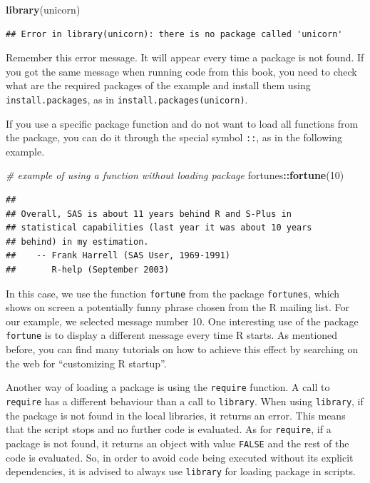 \documentclass[11pt,]{book}
\newenvironment{Shaded}{\begin{snugshade}}{\end{snugshade}}
\newcommand{\KeywordTok}[1]{\textcolor[rgb]{0.27,0.27,0.27}{\textbf{#1}}}
\newcommand{\DecValTok}[1]{\textcolor[rgb]{0.06,0.06,0.06}{#1}}
\newcommand{\CommentTok}[1]{\textcolor[rgb]{0.56,0.35,0.01}{\textit{#1}}}
\newcommand{\OperatorTok}[1]{\textcolor[rgb]{0.81,0.36,0.00}{\textbf{#1}}}
\newcommand{\NormalTok}[1]{#1}
\begin{document}
\begin{Shaded}
\begin{Highlighting}[]
\KeywordTok{library}\NormalTok{(unicorn)}
\end{Highlighting}
\end{Shaded}

\begin{verbatim}
## Error in library(unicorn): there is no package called 'unicorn'
\end{verbatim}

Remember this error message. It will appear every time a package is not
found. If you got the same message when running code from this book, you
need to check what are the required packages of the example and install
them using \texttt{install.packages}, as in
\texttt{install.packages(\textquotesingle{}unicorn\textquotesingle{})}.

If you use a specific package function and do not want to load all
functions from the package, you can do it through the special symbol
\texttt{::}, as in the following example. 

\begin{Shaded}
\begin{Highlighting}[]
\CommentTok{# example of using a function without loading package}
\NormalTok{fortunes}\OperatorTok{::}\KeywordTok{fortune}\NormalTok{(}\DecValTok{10}\NormalTok{)}
\end{Highlighting}
\end{Shaded}

\begin{verbatim}
## 
## Overall, SAS is about 11 years behind R and S-Plus in
## statistical capabilities (last year it was about 10 years
## behind) in my estimation.
##    -- Frank Harrell (SAS User, 1969-1991)
##       R-help (September 2003)
\end{verbatim}

In this case, we use the function \texttt{fortune} from the package
\texttt{fortunes}, which shows on screen a potentially funny phrase
chosen from the R mailing list. For our example, we selected message
number 10. One interesting use of the package \texttt{fortune} is to
display a different message every time R starts. As mentioned before,
you can find many tutorials on how to achieve this effect by searching
on the web for ``customizing R startup''.

Another way of loading a package is using the \texttt{require} function.
A call to \texttt{require} has a different behaviour than a call to
\texttt{library}. When using \texttt{library}, if the package is not
found in the local libraries, it returns an error. This means that the
script stops and no further code is evaluated. As for \texttt{require},
if a package is not found, it returns an object with value
\texttt{FALSE} and the rest of the code is evaluated. So, in order to
avoid code being executed without its explicit dependencies, it is
advised to always use \texttt{library} for loading package in scripts.
\end{document}
